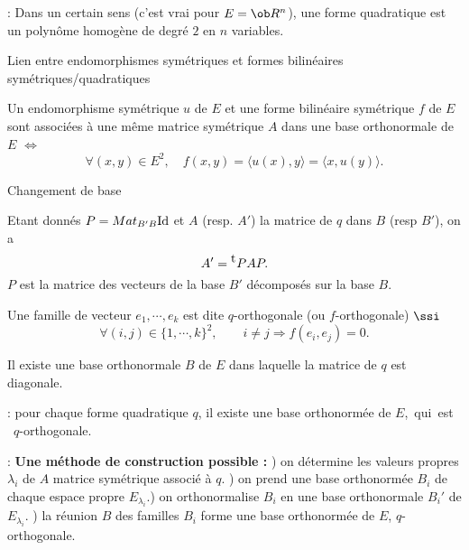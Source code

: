 \Remarque : Dans un certain sens (c'est vrai pour $E=\ob R^n$), une forme quadratique 
est un polynôme homogène de degré $2$ en $n$ variables. 
\bigskip
 

\Concept Lien entre endomorphismes symétriques et formes bilinéaires symétriques/quadratiques

Un endomorphisme symétrique $u$ de $E$ et une forme bilinéaire symétrique 
$f$ de $E$ sont associées à une même matrice symétrique $A$ 
dans une base orthonormale de $E$ $\Leftrightarrow$ 
$$
\forall(x,y)\in E^2, \quad f(x,y)=\langle u(x),y\rangle=\langle x,u(y)\rangle.
$$ 


\Concept Changement de base

Etant donnés $P={\sc Mat}_{B'B}\mbox{Id}$ et $A$ (resp. $A'$) 
la matrice de $q$ dans $B$ (resp $B'$), on a 
$$
A'=\null^{\mbox{t}}PAP. 
$$
$P$ est la matrice des vecteurs de la base $B'$ décomposés sur la base $B$. 

Une famille de vecteur $e_1,\cdots,e_k$ est dite $q$-orthogonale (ou $f$-orthogonale) $\ssi$
$$
\forall(i,j)\in\{1,\cdots,k\}^2, \qquad i\neq j\Rightarrow f(e_i,e_j)=0.
$$


Il existe une base orthonormale $B$ de $E$ dans laquelle la matrice de $q$ est diagonale. 

\Remarque : pour chaque forme quadratique $q$, il existe une base orthonormée de $E$,~qui~est ~$q$-orthogonale. 

\Remarque : {\bf Une méthode de construction possible : }) on détermine les valeurs propres $\lambda_i$ de $A$ matrice symétrique associé à $q$. ) on prend une base orthonormée $B_i$ de chaque espace propre $E_{\lambda_i}$.) on orthonormalise $B_i$ en une base orthonormale $B_i'$ de $E_{\lambda_i}$. \pn{}) la réunion $B$ des familles $B_i$ forme une base orthonormée de $E$, $q$-orthogonale. 
\bigskip


\vfill\null\eject


































